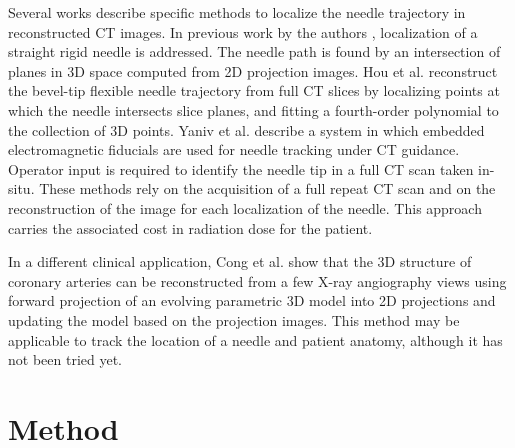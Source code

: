 Several works describe specific methods to localize the needle trajectory in reconstructed CT images. 
In previous work by the authors \cite{medan2017reduced}, localization of a straight rigid needle is addressed. The needle path is found by an intersection of planes in 3D space computed from 2D projection images. 
Hou et al. \cite{huo2015shape} reconstruct the bevel-tip flexible needle trajectory from full CT slices by localizing points at which the needle intersects slice planes, and fitting a fourth-order polynomial to the collection of 3D points.
Yaniv et al. \cite{yaniv2010needle} describe a system in which embedded electromagnetic fiducials are used for needle tracking under CT guidance. Operator input is required to identify the needle tip in a full CT scan taken in-situ. These methods rely on the acquisition of a full repeat CT scan and on the reconstruction of the image for each localization of the needle. This approach carries the associated cost in radiation dose for the patient. 

In a different clinical application, Cong et al.  \cite{cong2015quantitative} show that the 3D structure of coronary arteries can be reconstructed from a few X-ray angiography views using forward projection of an evolving parametric 3D model into 2D projections and updating the model based on the projection images. This method may be applicable to track the location of a needle and patient anatomy, although it has not been tried yet. 

\section{Method}

